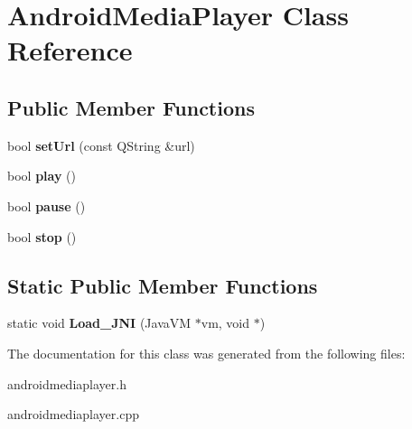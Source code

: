 \hypertarget{classAndroidMediaPlayer}{\section{Android\-Media\-Player Class Reference}
\label{classAndroidMediaPlayer}
}
\subsection*{Public Member Functions}
\begin{DoxyCompactItemize}
\item 
\hypertarget{classAndroidMediaPlayer_a9331cbd92a9587ba2b65e31f184552dc}{bool {\bfseries set\-Url} (const Q\-String \&url)}\label{classAndroidMediaPlayer_a9331cbd92a9587ba2b65e31f184552dc}

\item 
\hypertarget{classAndroidMediaPlayer_a2c9bf064ba87ce76ebabdc7f0ad918af}{bool {\bfseries play} ()}\label{classAndroidMediaPlayer_a2c9bf064ba87ce76ebabdc7f0ad918af}

\item 
\hypertarget{classAndroidMediaPlayer_a5903eacc6582452e14c48b697edfe442}{bool {\bfseries pause} ()}\label{classAndroidMediaPlayer_a5903eacc6582452e14c48b697edfe442}

\item 
\hypertarget{classAndroidMediaPlayer_a97dd2dff637c53374ea0e0e94cd99696}{bool {\bfseries stop} ()}\label{classAndroidMediaPlayer_a97dd2dff637c53374ea0e0e94cd99696}

\end{DoxyCompactItemize}
\subsection*{Static Public Member Functions}
\begin{DoxyCompactItemize}
\item 
\hypertarget{classAndroidMediaPlayer_a0f5353464292a5ff4bb5287eef1073a7}{static void {\bfseries Load\-\_\-\-J\-N\-I} (Java\-V\-M $\ast$vm, void $\ast$)}\label{classAndroidMediaPlayer_a0f5353464292a5ff4bb5287eef1073a7}

\end{DoxyCompactItemize}


The documentation for this class was generated from the following files\-:\begin{DoxyCompactItemize}
\item 
androidmediaplayer.\-h\item 
androidmediaplayer.\-cpp\end{DoxyCompactItemize}
